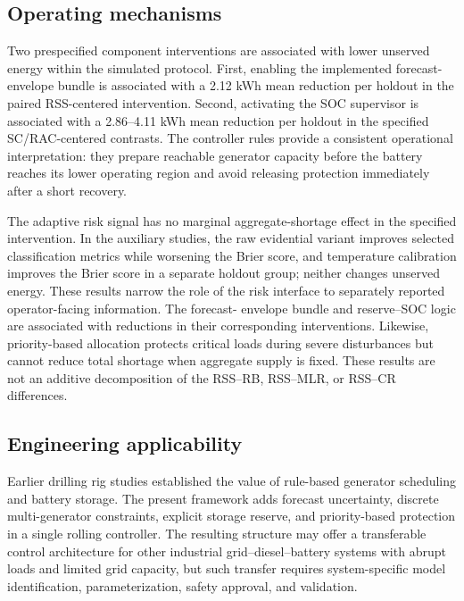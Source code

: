 \subsection{Operating mechanisms}\label{operating-mechanisms}

Two prespecified component interventions are associated with lower unserved
energy within the simulated protocol. First, enabling the implemented forecast-
envelope bundle is associated with a 2.12 kWh mean reduction per holdout in the
paired RSS-centered intervention. Second, activating the SOC supervisor is
associated with a 2.86--4.11 kWh mean reduction per holdout in the specified
SC/RAC-centered contrasts. The controller rules provide a consistent operational
interpretation: they prepare reachable generator capacity before the battery
reaches its lower operating region and avoid releasing protection immediately
after a short recovery.

The adaptive risk signal has no marginal aggregate-shortage effect in the
specified intervention. In the auxiliary studies, the raw evidential variant
improves selected classification metrics while worsening the Brier score, and
temperature calibration improves the Brier score in a separate holdout group;
neither changes unserved energy. These results narrow the role of the risk
interface to separately reported operator-facing information. The forecast-
envelope bundle and reserve--SOC logic are associated with reductions in their
corresponding interventions. Likewise, priority-based allocation protects
critical loads during severe disturbances but cannot reduce total shortage when
aggregate supply is fixed. These results are not an additive decomposition of
the RSS--RB, RSS--MLR, or RSS--CR differences.

\subsection{Engineering applicability}\label{engineering-applicability}

Earlier drilling rig studies established the value of rule-based generator
scheduling and battery storage. The present framework adds forecast
uncertainty, discrete multi-generator constraints, explicit storage reserve,
and priority-based protection in a single rolling controller. The resulting
structure may offer a transferable control architecture for other industrial
grid--diesel--battery systems with abrupt loads and limited grid capacity, but
such transfer requires system-specific model identification, parameterization,
safety approval, and validation.

